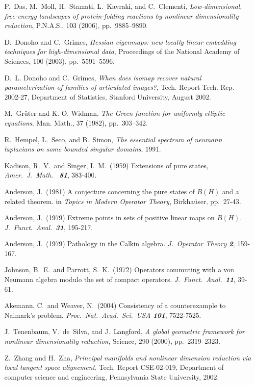 \documentclass{pnastwo}
\begin{document}
\begin{article}
\begin{thebibliography}{10}
P.~Das, M.~Moll, H.~Stamati, L.~Kavraki, and C.~Clementi, {\em
  Low-dimensional, free-energy landscapes of protein-folding reactions by
  nonlinear dimensionality reduction}, P.N.A.S., 103 (2006), pp.~9885--9890.

D.~Donoho and C.~Grimes, {\em Hessian eigenmaps: new locally linear
  embedding techniques for high-dimensional data}, Proceedings of the National
  Academy of Sciences, 100 (2003), pp.~5591--5596.

D.~L. Donoho and C.~Grimes, {\em When does isomap recover natural
  parameterization of families of articulated images?}, Tech. Report Tech. Rep.
  2002-27, Department of Statistics, Stanford University, August 2002.

M.~Gr\"uter and K.-O. Widman, {\em The {G}reen function for uniformly
  elliptic equations}, Man. Math., 37 (1982), pp.~303--342.

R.~Hempel, L.~Seco, and B.~Simon, {\em The essential spectrum of neumann
  laplacians on some bounded singular domains}, 1991.

Kadison, R.\ V.\ and Singer, I.\ M.\ (1959)
Extensions of pure states, {\it Amer.\ J.\ Math.\ \bf
81}, 383-400.

Anderson, J.\ (1981) A conjecture concerning the pure states of
$B(H)$ and a related theorem. in {\it Topics in Modern Operator
Theory}, Birkha\"user, pp.\ 27-43.

Anderson, J.\ (1979) Extreme points in sets of
positive linear maps on $B(H)$. {\it J.\ Funct.\
Anal.\
\bf 31}, 195-217.

Anderson, J.\ (1979) Pathology in the Calkin algebra. {\it J.\
Operator Theory \bf 2}, 159-167.

\bibitem{5}
Johnson, B.\ E.\ and Parrott, S.\ K.\ (1972) Operators commuting
with a von Neumann algebra modulo the set of compact operators.
{\it J.\ Funct.\ Anal.\ \bf 11}, 39-61.

\bibitem{6}
Akemann, C.\ and Weaver, N.\ (2004) Consistency of a
counterexample to Naimark's problem. {\it Proc.\ Nat.\ Acad.\
Sci.\ USA \bf 101}, 7522-7525.

\bibitem{TSL}
J.~Tenenbaum, V.~de~Silva, and J.~Langford, {\em A global geometric
  framework for nonlinear dimensionality reduction}, Science, 290 (2000),
  pp.~2319--2323.

\bibitem{ZhaZha}
Z.~Zhang and H.~Zha, {\em Principal manifolds and nonlinear dimension
  reduction via local tangent space alignement}, Tech. Report CSE-02-019,
  Department of computer science and engineering, Pennsylvania State
  University, 2002.
\end{thebibliography}


\end{article}
\end{document}
